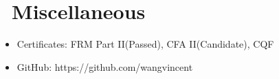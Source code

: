 \documentclass{resume}
\begin{document}
\section{\faInfo\ Miscellaneous}
\begin{itemize}[parsep=0.5ex]
  \item Certificates: FRM Part II(Passed), CFA II(Candidate), CQF
  \item GitHub: https://github.com/wangvincent
\end{itemize}

%
%
\end{document}
